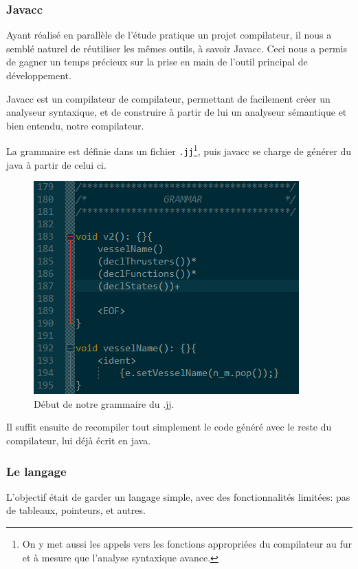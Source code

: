 \documentclass[a4paper,11pt]{article}
\begin{document}
    \subsubsection{Javacc}
        Ayant réalisé en parallèle de l'étude pratique un projet compilateur, il nous a semblé naturel de réutiliser les mêmes outils, à savoir Javacc. Ceci nous a permis de gagner un temps précieux sur la prise en main de l'outil principal de développement.

        Javacc est un compilateur de compilateur, permettant de facilement créer un analyseur syntaxique, et de construire à partir de lui un analyseur sémantique et bien entendu, notre compilateur.
        
        La grammaire est définie dans un fichier \verb|.jj|\footnote{On y met aussi les appels vers les fonctions appropriées du compilateur au fur et à mesure que l'analyse syntaxique avance.}, puis javacc se charge de générer du java à partir de celui ci.
        
        \begin{figure}[!h]
            \begin{center}
                \includegraphics{img/grammar_jj.png}
                \caption{Début de notre grammaire du .jj.}
            \end{center}
        \end{figure}
        
        Il suffit ensuite de recompiler tout simplement le code généré avec le reste du compilateur, lui déjà écrit en java.

    \subsubsection{Le langage}
        L'objectif était de garder un langage simple, avec des fonctionnalités limitées: pas de tableaux, pointeurs, et autres.
\end{document}
